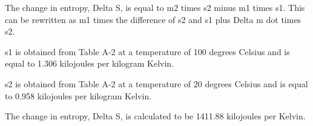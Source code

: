 The change in entropy, Delta S, is equal to m2 times s2 minus m1 times s1. This can be rewritten as m1 times the difference of s2 and s1 plus Delta m dot times s2.

s1 is obtained from Table A-2 at a temperature of 100 degrees Celsius and is equal to 1.306 kilojoules per kilogram Kelvin.

s2 is obtained from Table A-2 at a temperature of 20 degrees Celsius and is equal to 0.958 kilojoules per kilogram Kelvin.

The change in entropy, Delta S, is calculated to be 1411.88 kilojoules per Kelvin.